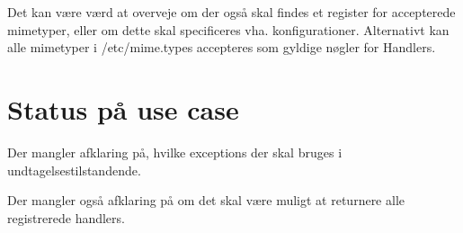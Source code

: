 \documentclass{article}
\begin{document}
Det kan være værd at overveje om der også skal findes et register for accepterede mimetyper, eller om dette skal specificeres vha. konfigurationer. Alternativt kan alle mimetyper i /etc/mime.types accepteres som gyldige nøgler for Handlers.

\section{Status på use case}
Der mangler afklaring på, hvilke exceptions der skal bruges i undtagelsestilstandende.

Der mangler også afklaring på om det skal være muligt at returnere alle registrerede handlers.
\end{document}
